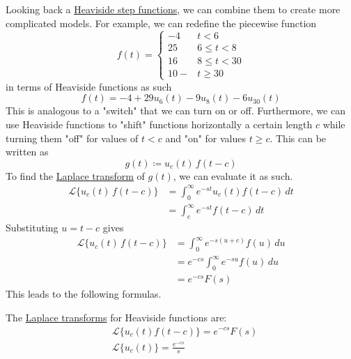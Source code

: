 \documentclass{article}
\newcounter{theorem}[section]
\newcounter{example}[section]
\begin{document}
    Looking back a \hyperref[def:heaviside-step-function]{Heaviside step functions}, we can combine them to create more complicated models. For example, we can redefine the piecewise function
    \begin{equation}
      f(t) = \begin{cases}
          -4 & t < 6 \\
          25 & 6 \leq t < 8 \\
          16 & 8 \leq t < 30 \\
          10- & t \geq 30
          \end{cases}
    \end{equation}
    in terms of Heaviside functions as such
    \begin{equation}
      f(t) = -4 + 29 u_6 (t) - 9 u_8 (t) - 6 u_{30} (t)
    \end{equation}
    This is analogous to a "switch" that we can turn on or off. Furthermore, we can use Heaviside functions to "shift" functions horizontally a certain length $c$ while turning them "off" for values of $t < c$ and "on" for values $t \geq c$. This can be written as 
    \begin{equation}
      g(t) \coloneqq u_c (t) \, f(t - c)
    \end{equation}
    To find the \hyperref[def:laplace-transform]{Laplace transform} of $g(t)$, we can evaluate it as such. 
    \begin{align*}
        \mathcal{L} \{u_c (t) \, f(t -c)\} & = \int_0^\infty e^{-s t} u_c (t) f(t-c) \,dt \\
        & = \int_c^\infty e^{-st} f(t-c) \,dt 
    \end{align*}
    Substituting $u = t - c$ gives
    \begin{align*}
         \mathcal{L} \{u_c (t) \, f(t -c)\} & = \int_0^\infty e^{-s (u+c)} f(u) \,du \\
         & = e^{-cs} \int_0^\infty e^{-su} f(u)\,du \\
         & = e^{-cs} F(s)
    \end{align*}
    This leads to the following formulas. 
    \begin{theorem}
      \label{thm:laplace-transforms-of-heaviside-functions}
    The \hyperref[def:laplace-transform]{Laplace transforms} for Heaviside functions are:
    \begin{align*}
        & \mathcal{L} \{u_c (t) f(t-c)\} = e^{-cs} F(s) \\
        & \mathcal{L} \{u_c (t)\} = \frac{e^{-cs}}{s}
    \end{align*}
    \end{theorem}
\end{document}
